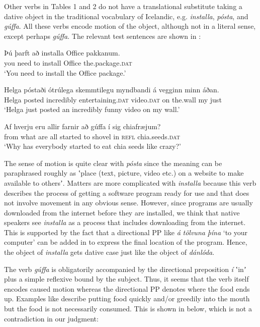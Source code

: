 \documentclass[output=paper,modfonts,nonflat,colorlinks,citecolor=brown]{langsci/langscibook}
\begin{document}
Other verbs in Tables 1 and 2 do not have a translational substitute taking a dative object in the traditional vocabulary of Icelandic, e.g. \textit{installa}, \textit{pósta}, and \textit{gúffa}. All these verbs encode motion of the object, although not in a literal sense, except perhaps \textit{gúffa}. The relevant test sentences are shown in :


\ea%
    \label{ex:jonsson:3}
\ea\label{ex:jonsson:3a}
\gll   Þú   þarft   að   installa   Office   pakkanum.\\
     you   need   to   install   Office   the.package.\textsc{dat}\\
\glt `You need to install the Office package.'

\ex\label{ex:jonsson:3b}
\gll   Helga  póstaði  ótrúlega  skemmtilegu  myndbandi  á  vegginn  minn  áðan.\\
 Helga   posted   incredibly   entertaining.\textsc{dat}   video.\textsc{dat}   on   the.wall   my   just\\
\glt `Helga just posted an incredibly funny video on my wall.'


\ex\label{ex:jonsson:3c}
\gll   Af hverju eru allir farnir að gúffa í sig chiafræjum?\\
 from what are all started to shovel in \textsc{refl} chia.seeds.\textsc{dat}\\
\glt `Why has everybody started to eat chia seeds like crazy?'
\z
\z

The sense of motion is quite clear with \textit{pósta} since the meaning can be paraphrased roughly as ʽplace (text, picture, video etc.) on a website to make available to othersʼ. Matters are more complicated with \textit{installa} because this verb describes the process of getting a software program ready for use and that does not involve movement in any obvious sense. However, since programs are usually downloaded from the internet before they are installed, we think that native speakers see \textit{installa} as a process that includes downloading from the internet. This is supported by the fact that a directional PP like \textit{á} \textit{tölvuna} \textit{þína} ‘to your computer’ can be added in  to express the final location of the program. Hence, the object of \textit{installa} gets dative case just like the object of \textit{dánlóda}.

The verb \textit{gúffa} is obligatorily accompanied by the directional preposition \textit{í} ʽinʼ plus a simple reflexive bound by the subject. Thus, it seems that the verb itself encodes caused motion whereas the directional PP denotes where the food ends up. Examples like  describe putting food quickly and/or greedily into the mouth but the food is not necessarily consumed. This is shown in  below, which is not a contradiction in our judgment:
\end{document}
